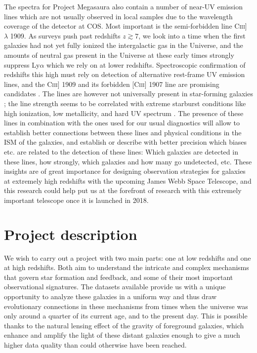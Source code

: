 \documentclass[12pt, a4paper]{scrartcl}
\begin{document}
The spectra for Project Megasaura also contain a number of near-UV emission
lines which are not usually observed in local samples due to the wavelength
coverage of the detector at COS. Most important is the semi-forbidden line
C\textsc{iii}] $\lambda$ 1909. As surveys push past redshifts $z \gtrsim 7$, we
look into a time when the first galaxies had not yet fully ionized the
intergalactic gas in the Universe, and the amounts of neutral gas present in the
Universe at these early times strongly suppress Ly$\alpha$ which we rely on at
lower redshifts. Spectroscopic confirmation of redshifts this high must rely on
detection of alternative rest-frame UV emission lines, and the C\textsc{iii}]
1909 and its forbidden [C\textsc{iii}] 1907 line are promising candidates
\citep{Stark2014,Jaskot2016}. The lines are however not universally present in
star-forming galaxies \citep{Rigby2015}; the line strength seems to be
correlated with extreme starburst conditions like high ionization, low
metallicity, and hard UV spectrum \citep{Stark2014,Jaskot2016}. The presence of
these lines in combination with the ones used for our usual diagnostics will
allow to establish better connections between these lines and physical
conditions in the ISM of the galaxies, and establish or describe with better
precision which biases etc. are related to the detection of these lines: Which
galaxies are detected in these lines, how strongly, which galaxies and how many
go undetected, etc. These insights are of great importance for designing
observation strategies for galaxies at extremely high redshifts with the
upcoming James Webb Space Telescope, and this research could help put us at the
forefront of research with this extremely important telescope once it is
launched in 2018.


\section{Project description}

We wish to carry out a project with two main parts: one at low redshifts and one
at high redshifts. Both aim to understand the intricate and complex mechanisms
that govern star formation and feedback, and some of their most important
observational signatures. The datasets available provide us with a unique
opportunity to analyze these galaxies in a uniform way and thus draw
evolutionary connections in these mechanisms from times when the universe was
only around a quarter of its current age, and to the present day. This is
possible thanks to the natural lensing effect of the gravity of foreground
galaxies, which enhance and amplify the light of these distant galaxies enough
to give a much higher data quality than could otherwise have been reached. 
\end{document}
